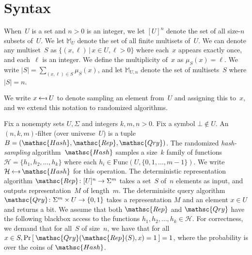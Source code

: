 \newcommand{\Rep}{\mathsc{Rep}}
\newcommand{\Hash}{\mathsc{Hash}}
\newcommand{\Qry}{\mathsc{Qry}}
\newcommand{\Update}{\mathsc{Up}}
\newcommand{\Init}{\mathsc{Init}}
\newcommand{\Test}{\mathsc{Test}}
\newcommand{\multiset}[1]{\mathbb{M}_{#1}}
\newcommand{\ExpCorrectSecHash}[2]{\mathrm{Exp}^{\mathrm{cor\mbox{-}prv}}_{#1}(#2)}
\newcommand{\ExpCorrectPubHash}[2]{\mathrm{Exp}^{\mathrm{cor\mbox{-}pub}}_{#1}(#2)}
\newcommand{\ExpCorrect}[2]{\mathrm{Exp}^{\mathrm{cor}}_{#1}(#2)}

\newcommand{\QryOracle}{\mathsf{Query}}
\newcommand{\UpdateOracle}{\mathsf{Update}}
\newcommand{\HashOracle}{\mathsf{Hash}}

\section{Syntax}
When~$U$ is a set and $n>0$ is an integer, we let $[U]^n$ denote the set of all size-$n$ subsets of~$U$.  We let $\multiset{U}$ denote the set of all finite multisets of~$U$.  We can denote any multiset~$S$ as $\{(x,\ell) \,|\, x \in U, \ell > 0\}$ where each~$x$ appears exactly once, and each~$\ell$ is an integer.  We define the multiplicity of~$x$ as $\mu_S(x) = \ell$.  We write $|S|= \sum_{(x,\ell)\in S}\mu_S(x)$, and let $\multiset{U,n}$ denote the set of multisets~$S$ where $|S|=n$. 

We write $x \getsr U$ to denote sampling an element from~$U$ and assigning this to~$x$, and we extend this notation to randomized algorithms.

Fix a nonempty sets $U,\Sigma$ and integers $k,m,n>0$.  Fix a symbol $\bot \not\in U$.  An $(n,k,m)$-filter (over universe~$U$) is a tuple  $B=(\Hash,\Rep,\Qry)$.   
%
The randomized \emph{hash-sampling} algorithm~$\Hash$ samples a size~$k$ family of functions~$\mathcal{H}=\{h_1,h_2,\ldots,h_k\}$ where each $h_i \in  \mathrm{Func}(U,\{0,1,\ldots,m-1\})$.  We write $\mathcal{H} \getsr \Hash$ for this operation.
%
The deterministic representation algorithm $\Rep\colon [U]^n \rightarrow \Sigma^m$ takes a set~$S$ of~$n$ elements as input, and outputs representation~$M$ of length~$m$.
%
The determinisitc query algorithm $\Qry\colon \Sigma^m \times U \rightarrow \bits$ takes a representation $M$ and an element $x \in U$ and returns a bit.  
%
We assume that both $\Rep$ and $\Qry$ have the following blackbox access to the functions $h_1,h_2,\ldots,h_k \in \mathcal{H}$.
%
For correctness, we demand that for all~$S$ of size~$n$, we have that for all $x \in S, \Prob{\Qry(\Rep(S),x)=1}=1$, where the probability is over the coins of $\Hash$.  



